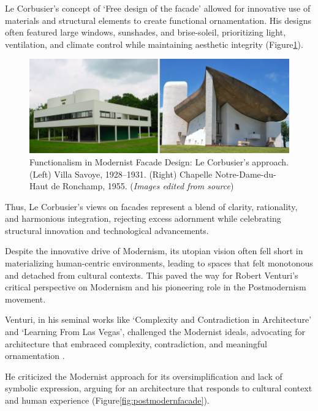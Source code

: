 Le Corbusier's concept of `Free design of the facade'\cite{Corbusier1986} allowed for innovative use of materials and structural elements to create functional ornamentation.
His designs often featured large windows, sunshades, and brise-soleil, prioritizing light, ventilation, and climate control while maintaining aesthetic integrity (Figure\ref{fig:Modernistfacade}).

    \begin{figure}[htb]
        \centering
        \includegraphics[width= \linewidth]{Images/ModernistFacade}
        \caption{Functionalism in Modernist Facade Design: Le Corbusier's approach. (Left) Villa Savoye, 1928--1931. (Right) Chapelle Notre-Dame-du-Haut de Ronchamp, 1955. (\textit{Images edited from source})}
        \label{fig:Modernistfacade}
    \end{figure}

Thus, Le Corbusier's views on facades represent a blend of clarity, rationality, and harmonious integration, rejecting excess adornment while celebrating structural innovation and technological advancements.


Despite the innovative drive of Modernism, its utopian vision often fell short in materializing human-centric environments, leading to spaces that felt monotonous and detached from cultural contexts.
This paved the way for Robert Venturi's critical perspective on Modernism and his pioneering role in the Postmodernism movement.

Venturi, in his seminal works like `Complexity and Contradiction in Architecture' and `Learning From Las Vegas', challenged the Modernist ideals, advocating for architecture that embraced complexity, contradiction, and meaningful ornamentation \cite{Venturi1972, Venturi1977}.

He criticized the Modernist approach for its oversimplification and lack of symbolic expression, arguing for an architecture that responds to cultural context and human experience (Figure\ref{fig:postmodernfacade}).

